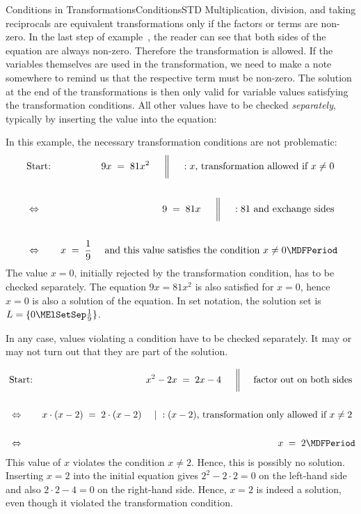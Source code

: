 \begin{MXContent}{Conditions in Transformations}{Conditions}{STD}
Multiplication, division, and taking reciprocals are equivalent transformations only if the factors or terms are 
non-zero. In the last step of example~, the reader can see that both sides of the equation are always non-zero. Therefore the transformation is allowed. If the variables themselves are used in the transformation, we need to make a note somewhere to remind us that the respective term must be non-zero. The solution at the end of the transformations is then 
only valid for variable values satisfying the transformation conditions. All other values have to be checked 
\textit{separately}, typically by inserting the value into the equation:

\begin{MExample}
In this example, the necessary transformation conditions are not problematic:
\begin{eqnarray*}
& \text{Start:} & 9x \;=\;81x^2  \ \ \ \ \MSep \ :x\text{, transformation allowed if }x\not=0\ \\ \ \\
& \Leftrightarrow & 9 \;=\; 81x  \ \ \ \ \MSep \ :81\text{ and exchange sides}\ \\ \ \\
& \Leftrightarrow & x \;=\; \Mdfrac19 \ \ \ \ \text{and this value satisfies the condition }x\not=0 \MDFPeriod
\end{eqnarray*}
The value $x=0$, initially rejected by the transformation condition, has to be checked separately. The equation $9x=81x^2$ is 
also satisfied for $x=0$, hence $x=0$ is also a solution of the equation. In set notation, the 
solution set is $\ML=\lbrace 0\MElSetSep \Mtfrac19\rbrace$.
\end{MExample}

In any case, values violating a condition have to be checked separately. It may or may not
turn out that they are part of the solution.

\begin{MExample}
\begin{eqnarray*}
& \text{Start:} & x^2-2x \;=\; 2x-4 \ \ \ \ \MSep \ \text{factor out on both sides} \ \\ \ \\
& \Leftrightarrow & x\cdot (x-2) \;=\; 2\cdot (x-2) \ \ \ \ | \ :(x-2)\text{, transformation only allowed if }x\not=2\ \\ \ \\
& \Leftrightarrow & x\;=\; 2  \MDFPeriod
\end{eqnarray*}
This value of $x$ violates the condition $x\not=2$. Hence, this is possibly no solution. Inserting $x=2$
into the initial equation gives $2^2-2\cdot 2=0$ on the left-hand side and also $2\cdot 2-4=0$ on the 
right-hand side. Hence, $x=2$ is indeed a solution, even though it violated the transformation condition.
\end{MExample}


\end{MXContent}
